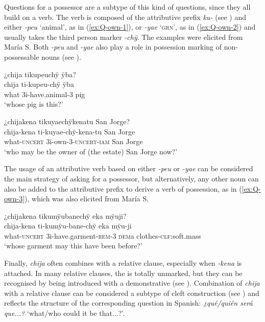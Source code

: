 Questions for a possessor  are a subtype of this kind of questions, since they all build on a verb. The verb is composed of the attributive prefix \textit{ku-} (see ) and either \textit{-peu} ‘animal’, as in (\ref{ex:Q-own-1}), or \textit{-yae} ‘\textsc{grn}’, as in (\ref{ex:Q-own-2}) and usually takes the third person marker \textit{-chÿ}. The examples were elicited from María S. Both \textit{-peu} and \textit{-yae} also play a role in possession marking of non-possessable nouns (see ).

\ea\label{ex:Q-own-1}
\begingl
\glpreamble ¿chija tikupeuchÿ ÿba?\\
\gla chija ti-kupeu-chÿ ÿba\\
\glb what 3i-have.animal-3 pig\\
\glft ‘whose pig is this?’
\endgl
\trailingcitation{[rxx-e201231f.08]}
\xe

\ea\label{ex:Q-own-2}
\begingl
\glpreamble ¿chijakena tikuyaechÿkenatu San Jorge?\\
\gla chija-kena ti-kuyae-chÿ-kena-tu {San Jorge}\\
\glb what-\textsc{uncert} 3i-own-3-\textsc{uncert}-\textsc{iam} {San Jorge}\\
\glft ‘who may be the owner of (the estate) San Jorge now?’
\endgl
\trailingcitation{[rxx-e201231f.34]}
\xe

The usage of an attributive verb based on either \textit{-peu} or \textit{-yae} can be considered the main strategy of asking for a possessor, but alternatively, any other noun can also be added to the attributive prefix to derive a verb of possession, as in (\ref{ex:Q-own-3}), which was also elicited from María S.

\ea\label{ex:Q-own-3}
\begingl
\glpreamble ¿chijakena tikumÿubanechÿ eka mÿuji?\\
\gla chija-kena ti-kumÿu-bane-chÿ eka mÿu-ji\\
\glb what-\textsc{uncert} 3i-have.garment-\textsc{rem}-3 \textsc{dem}a clothes-\textsc{clf:}soft.mass\\
\glft ‘whose garment may this have been before?’
\endgl
\trailingcitation{[rxx-e201231f.44]}
\xe
{}

Finally, \textit{chija} often combines with a relative clause, especially when \textit{-kena} is attached. In many relative clauses, the  is totally unmarked, but they can be recognised by being introduced with a demonstrative (see ). Combination of \textit{chija} with a relative clause can be considered a subtype of cleft construction (see ) and reflects the structure of the corresponding question in Spanish: \textit{¿qué/quién será que...?} ‘what/who could it be that...?’.

